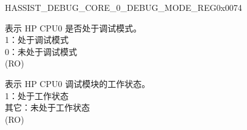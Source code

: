 \begin{register}{H}{ASSIST\_DEBUG\_CORE\_0\_DEBUG\_MODE\_REG}{0x0074}\label{regdesc:ASSISTDEBUGCORE0DEBUGMODEREG}
%
%
%
\regnewline%
\begin{regdesc}\begin{reglist}
\label{fielddesc:ASSISTDEBUGCORE0DEBUGMODE}\item [ASSIST\_DEBUG\_CORE\_0\_DEBUG\_MODE] 表示 HP CPU0 是否处于调试模式。\\
1：处于调试模式\\
0：未处于调试模式\\
(RO)
\label{fielddesc:ASSISTDEBUGCORE0DEBUGMODULEACTIVE}\item [ASSIST\_DEBUG\_CORE\_0\_DEBUG\_MODULE\_ACTIVE] 表示 HP CPU0 调试模块的工作状态。\\
1：处于工作状态\\
其它：未处于工作状态\\
(RO)
\end{reglist}\end{regdesc}
\end{register}


